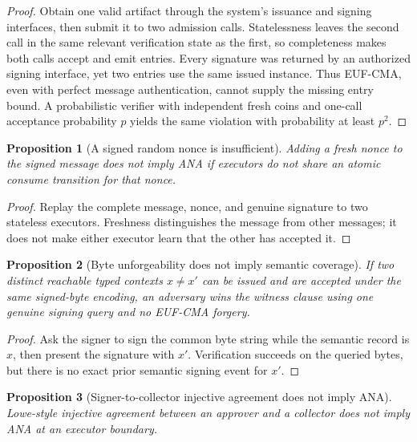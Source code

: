 \documentclass[10pt]{article}
\newtheorem{proposition}{Proposition}
\begin{document}
\begin{proof}
Obtain one valid artifact through the system's issuance and signing interfaces,
then submit it to two admission calls. Statelessness leaves the second call in
the same relevant verification state as the first, so completeness makes both
calls accept and emit entries. Every signature was returned by an authorized
signing interface, yet two entries use the same issued instance. Thus EUF-CMA,
even with perfect message authentication, cannot supply the missing entry
bound. A probabilistic verifier with independent fresh coins and one-call
acceptance probability $p$ yields the same violation with probability at least
$p^2$.
\end{proof}

\begin{proposition}[A signed random nonce is insufficient]
Adding a fresh nonce to the signed message does not imply ANA if executors do not
share an atomic consume transition for that nonce.
\end{proposition}

\begin{proof}
Replay the complete message, nonce, and genuine signature to two stateless
executors. Freshness distinguishes the message from other messages; it does not
make either executor learn that the other has accepted it.
\end{proof}

\begin{proposition}[Byte unforgeability does not imply semantic coverage]
If two distinct reachable typed contexts $x\neq x'$ can be issued and are
accepted under the same signed-byte encoding, an adversary wins the witness
clause using one genuine signing query and no EUF-CMA forgery.
\end{proposition}

\begin{proof}
Ask the signer to sign the common byte string while the semantic record is $x$,
then present the signature with $x'$. Verification succeeds on the queried bytes,
but there is no exact prior semantic signing event for $x'$.
\end{proof}

\begin{proposition}[Signer-to-collector injective agreement does not imply ANA]
\label{prop:agreement-not-ana}
Lowe-style injective agreement between an approver and a collector does not
imply ANA at an executor boundary.
\end{proposition}
\end{document}
